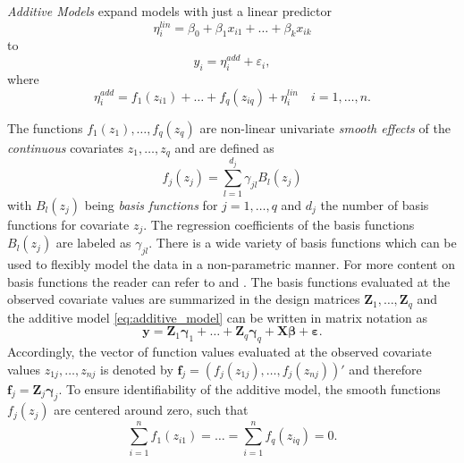 
\textit{Additive Models} \citep{fahrmeir2003regression} expand models with just a linear predictor  
\begin{equation}
\eta_{i}^{lin} = \beta_{0}+\beta_{1} x_{i1}+\ldots+\beta_{k} x_{i k}
\end{equation}
to 
\begin{equation}
y_{i} = \eta_{i}^{add} + \varepsilon_{i} ,
\label{eq:additive_model}
\end{equation}
where 
\begin{equation}
\eta_{i}^{a d d}=f_{1}\left(z_{i 1}\right)+\ldots+f_{q}\left(z_{i q}\right)+\eta_{i}^{l i n} \quad i = 1, \ldots, n.
\end{equation}

The functions $f_{1}(z_{1}), \ldots, f_{q}(z_{q})$ are non-linear univariate \textit{smooth effects} of the \textit{continuous} covariates $z_1, \ldots, z_q$ and are defined as
\begin{equation}
f_{j}\left(z_{j}\right)=\sum_{l=1}^{d_{j}} \gamma_{j l} B_{l}\left(z_{j}\right)
\end{equation}
with $B_{l}\left(z_{j}\right)$ being \textit{basis functions} for $j = 1, \ldots, q$ and $d_j$ the number of basis functions for covariate $z_j$. The regression coefficients of the basis functions $B_l(z_j)$ are labeled as $\gamma_{jl}$. There is a wide variety of basis functions which can be used to flexibly model the data in a non-parametric manner. For more content on basis functions the reader can refer to \cite{wood2017generalized} and \cite{fahrmeir2003regression}. The basis functions evaluated at the observed covariate values are summarized in the design matrices $\bm{Z}_1, \ldots, \bm{Z}_q$ and the additive model \ref{eq:additive_model} can be written in matrix notation as
\begin{equation}
\bm{y} = \bm{Z}_1 \bm{\gamma}_1 + \ldots + \bm{Z}_q \bm{\gamma}_q + \bm{X} \bm{\beta} + \bm{\varepsilon}.
\label{eq:gam_matrix_notation}
\end{equation}
Accordingly, the vector of function values evaluated at the observed covariate values $z_{1j}, \ldots, z_{nj}$ is denoted by $\bm{f}_j = (f_j(z_{1j}), \ldots, f_j(z_{nj}))' $ and therefore $\bm{f}_j = \bm{Z}_j \bm{\gamma}_j$. To ensure identifiability of the additive model, the smooth functions $f_j(z_j)$ are centered around zero, such that
\begin{equation}
\sum_{i=1}^{n} f_{1}\left(z_{i 1}\right)=\ldots=\sum_{i=1}^{n} f_{q}\left(z_{i q}\right)=0.
\end{equation}


